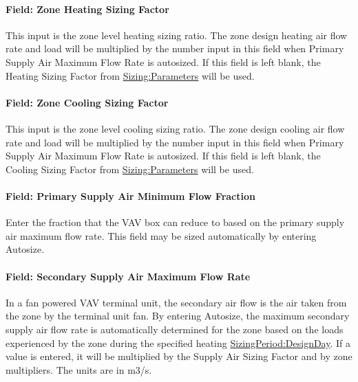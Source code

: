 \paragraph{Field: Zone Heating Sizing Factor}\label{field-zone-heating-sizing-factor-8}

This input is the zone level heating sizing ratio. The zone design heating air flow rate and load will be multiplied by the number input in this field when Primary Supply Air Maximum Flow Rate is autosized. If this field is left blank, the Heating Sizing Factor from \hyperref[sizingparameters]{Sizing:Parameters} will be used.

\paragraph{Field: Zone Cooling Sizing Factor}\label{field-zone-cooling-sizing-factor-7}

This input is the zone level cooling sizing ratio. The zone design cooling air flow rate and load will be multiplied by the number input in this field when Primary Supply Air Maximum Flow Rate is autosized. If this field is left blank, the Cooling Sizing Factor from \hyperref[sizingparameters]{Sizing:Parameters} will be used.

\paragraph{Field: Primary Supply Air Minimum Flow Fraction}\label{field-primary-supply-air-minimum-flow-fraction}

Enter the fraction that the VAV box can reduce to based on the primary supply air maximum flow rate. This field may be sized automatically by entering Autosize.

\paragraph{Field: Secondary Supply Air Maximum Flow Rate}\label{field-secondary-supply-air-maximum-flow-rate}

In a fan powered VAV terminal unit, the secondary air flow is the air taken from the zone by the terminal unit fan. By entering Autosize, the maximum secondary supply air flow rate is automatically determined for the zone based on the loads experienced by the zone during the specified heating \hyperref[sizingperioddesignday]{SizingPeriod:DesignDay}. If a value is entered, it will be multiplied by the Supply Air Sizing Factor and by zone multipliers. The units are in m3/s.

